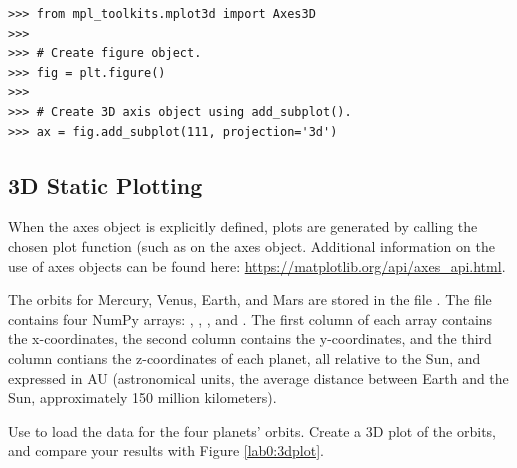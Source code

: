 \begin{lstlisting}
>>> from mpl_toolkits.mplot3d import Axes3D
>>>
>>> # Create figure object.
>>> fig = plt.figure()
>>>
>>> # Create 3D axis object using add_subplot().
>>> ax = fig.add_subplot(111, projection='3d')
\end{lstlisting}

\subsection*{3D Static Plotting}

When the axes object is explicitly defined, plots are generated by calling the chosen plot function (such as  on the axes object.
Additional information on the use of axes objects can be found here: \href{https://matplotlib.org/api/axes\_api.html}{https://matplotlib.org/api/axes\_api.html}.

\begin{problem}
The orbits for Mercury, Venus, Earth, and Mars are stored in the file .
The file contains four NumPy arrays: , , , and .
The first column of each array contains the x-coordinates, the second column contains the y-coordinates, and the third column contians the z-coordinates of each planet, all relative to the Sun, and expressed in AU (astronomical units, the average distance between Earth and the Sun, approximately 150 million kilometers).

Use  to load the data for the four planets' orbits.
Create a 3D plot of the orbits, and compare your results with Figure \ref{lab0:3dplot}.
\end{problem}

